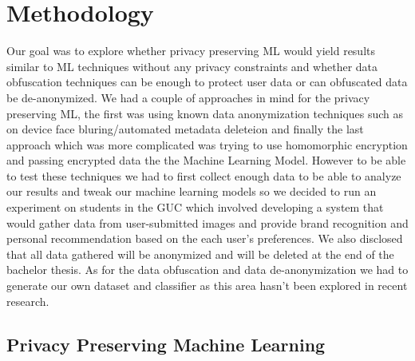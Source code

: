 \SIthousandsep{,}
\chapter{Methodology}
\label{chap:Three}
Our goal was to explore whether privacy preserving ML would yield results similar to ML techniques without any privacy constraints and whether data obfuscation techniques can be enough to protect user data or can obfuscated data be de-anonymized.
We had a couple of approaches in mind for the privacy preserving ML, the first was using known data anonymization techniques such as on device face bluring/automated metadata deleteion and 
finally the last approach which was more complicated was trying to use homomorphic encryption and passing encrypted data the the Machine Learning Model.
However to be able to test these techniques we had to first collect enough data to be able to analyze our results and tweak our machine learning models so we decided to run an experiment on students in the GUC which involved developing a system that would gather data from user-submitted images and provide brand recognition and personal recommendation based on the each user’s preferences.
We also disclosed that all data gathered will be anonymized and will be deleted at the end of the bachelor thesis.
As for the  data obfuscation and data de-anonymization we had to generate our own dataset and classifier as this area hasn't been explored in recent research.
\section{Privacy Preserving Machine Learning}
